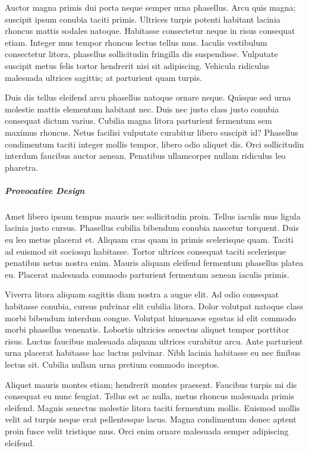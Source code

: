 \documentclass{article}
\begin{document}
Auctor magna primis dui porta neque semper urna phasellus. Arcu quis magna; suscipit ipsum conubia taciti primis. Ultrices turpis potenti habitant lacinia rhoncus mattis sodales natoque. Habitasse consectetur neque in risus consequat etiam. Integer mus tempor rhoncus lectus tellus mus. Iaculis vestibulum consectetur litora, phasellus sollicitudin fringilla dis suspendisse. Vulputate suscipit metus felis tortor hendrerit nisi sit adipiscing. Vehicula ridiculus malesuada ultrices sagittis; at parturient quam turpis.

Duis dis tellus eleifend arcu phasellus natoque ornare neque. Quisque sed urna molestie mattis elementum habitant nec. Duis nec justo class justo conubia consequat dictum varius. Cubilia magna litora parturient fermentum sem maximus rhoncus. Netus facilisi vulputate curabitur libero suscipit id? Phasellus condimentum taciti integer mollis tempor, libero odio aliquet dis. Orci sollicitudin interdum faucibus auctor aenean. Penatibus ullamcorper nullam ridiculus leo pharetra.
 
\subparagraph{Provocative Design}
Amet libero ipsum tempus mauris nec sollicitudin proin. Tellus iaculis mus ligula lacinia justo cursus. Phasellus cubilia bibendum conubia nascetur torquent. Duis eu leo metus placerat et. Aliquam cras quam in primis scelerisque quam. Taciti ad euismod sit sociosqu habitasse. Tortor ultrices consequat taciti scelerisque penatibus netus nostra enim. Mauris aliquam eleifend fermentum phasellus platea eu. Placerat malesuada commodo parturient fermentum aenean iaculis primis.

Viverra litora aliquam sagittis diam nostra a augue elit. Ad odio consequat habitasse conubia, cursus pulvinar elit cubilia litora. Dolor volutpat natoque class morbi bibendum interdum congue. Volutpat himenaeos egestas id elit commodo morbi phasellus venenatis. Lobortis ultricies senectus aliquet tempor porttitor risus. Luctus faucibus malesuada aliquam ultrices curabitur arcu. Ante parturient urna placerat habitasse hac luctus pulvinar. Nibh lacinia habitasse eu nec finibus lectus sit. Cubilia nullam urna pretium commodo inceptos.

Aliquet mauris montes etiam; hendrerit montes praesent. Faucibus turpis mi dis consequat eu nunc feugiat. Tellus est ac nulla, metus rhoncus malesuada primis eleifend. Magnis senectus molestie litora taciti fermentum mollis. Euismod mollis velit ad turpis neque erat pellentesque lacus. Magna condimentum donec aptent proin fusce velit tristique mus. Orci enim ornare malesuada semper adipiscing eleifend.
\end{document}
